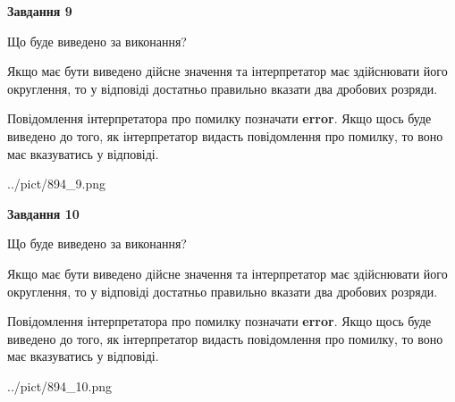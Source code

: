 \documentclass[12pt, ukrainian]{article}
\begin{document}
{\begin {Large}
{\begin {center}\textbf{Завдання 9}\end {center}}\par
Що буде виведено за виконання? \par

Якщо має бути виведено дійсне значення та інтерпретатор має здійснювати його округлення, 
то у відповіді достатньо правильно вказати два дробових розряди.

Повідомлення інтерпретатора про помилку позначати \textbf{error}.
Якщо щось буде виведено до того, як інтерпретатор видасть повідомлення про помилку, 
то воно має вказуватись у відповіді. \par

\begin{center}
	{../pict/894_9.png}
\end{center}
\newpage

{\begin {center}\textbf{Завдання 10}\end {center}}\par
Що буде виведено за виконання? \par

Якщо має бути виведено дійсне значення та інтерпретатор має здійснювати його округлення, 
то у відповіді достатньо правильно вказати два дробових розряди.

Повідомлення інтерпретатора про помилку позначати \textbf{error}.
Якщо щось буде виведено до того, як інтерпретатор видасть повідомлення про помилку, 
то воно має вказуватись у відповіді. \par

\begin{center}
	{../pict/894_10.png}
\end{center}
\newpage

\end {Large}}
\end{document}
